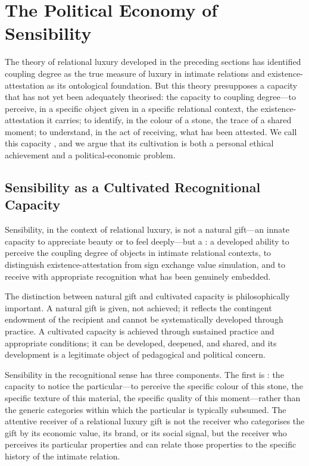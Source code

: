 \section{The Political Economy of Sensibility}
\label{p16:sec:sensibility}

\noindent
The theory of relational luxury developed in the preceding sections has identified coupling degree as the true measure of luxury in intimate relations and existence-attestation as its ontological foundation. But this theory presupposes a capacity that has not yet been adequately theorised: the capacity to  coupling degree---to perceive, in a specific object given in a specific relational context, the existence-attestation it carries; to identify, in the colour of a stone, the trace of a shared moment; to understand, in the act of receiving, what has been attested. We call this capacity , and we argue that its cultivation is both a personal ethical achievement and a political-economic problem.

\subsection{Sensibility as a Cultivated Recognitional Capacity}
\label{p16:subsec:sensibility_defined}

\noindent
Sensibility, in the context of relational luxury, is not a natural gift---an innate capacity to appreciate beauty or to feel deeply---but a : a developed ability to perceive the coupling degree of objects in intimate relational contexts, to distinguish existence-attestation from sign exchange value simulation, and to receive with appropriate recognition what has been genuinely embedded.

The distinction between natural gift and cultivated capacity is philosophically important. A natural gift is given, not achieved; it reflects the contingent endowment of the recipient and cannot be systematically developed through practice. A cultivated capacity is achieved through sustained practice and appropriate conditions; it can be developed, deepened, and shared, and its development is a legitimate object of pedagogical and political concern.

Sensibility in the recognitional sense has three components. The first is : the capacity to notice the particular---to perceive the specific colour of this stone, the specific texture of this material, the specific quality of this moment---rather than the generic categories within which the particular is typically subsumed. The attentive receiver of a relational luxury gift is not the receiver who categorises the gift by its economic value, its brand, or its social signal, but the receiver who perceives its particular properties and can relate those properties to the specific history of the intimate relation.

